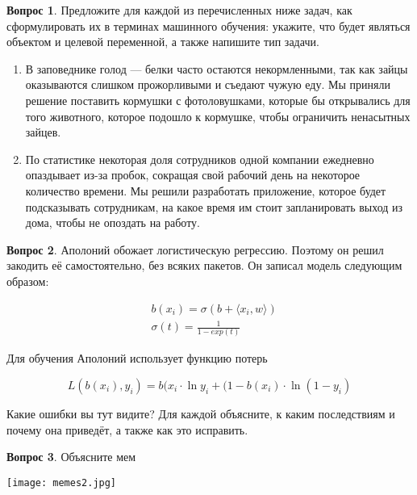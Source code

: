 \documentclass[12pt]{article}
\theoremstyle{definition}
\newtheorem{question}{Вопрос}
\begin{document}
\begin{question}
Предложите для каждой из перечисленных ниже задач, как сформулировать их в терминах машинного обучения: укажите, что будет являться объектом и целевой переменной, а также напишите тип задачи.

\begin{enumerate}
    \item В заповеднике голод --- белки часто остаются некормленными, так как зайцы оказываются слишком прожорливыми и съедают чужую еду. Мы приняли решение поставить кормушки с фотоловушками, которые бы открывались для того животного, которое подошло к кормушке, чтобы ограничить ненасытных зайцев.
  \item По статистике некоторая доля сотрудников одной компании ежедневно опаздывает из-за пробок, сокращая свой рабочий день на некоторое количество времени. Мы решили разработать приложение, которое будет подсказывать сотрудникам, на какое время им стоит запланировать выход из дома, чтобы не опоздать на работу.
\end{enumerate}
\end{question}


\vspace{4cm} 



\begin{question}
Аполоний обожает логистическую регрессию. Поэтому он решил закодить её самостоятельно, без всяких пакетов. Он записал модель следующим образом: 

\begin{equation*} 
\begin{aligned}
    & b(x_i) = \sigma(b + \langle x_i, w \rangle) \\
    & \sigma(t) = \frac{1}{1 - exp(t)}
\end{aligned}
\end{equation*}

Для обучения Аполоний использует функцию потерь 

\[
L(b(x_i), y_i) = b(x_i \cdot \ln y_i + (1 - b(x_i) \cdot \ln (1 - y_i)
\]

Какие ошибки вы тут видите? Для каждой объясните, к каким последствиям и почему она приведёт, а также как это исправить.
\end{question}


\newpage 

\begin{question}
Объясните мем
\begin{center}
  \texttt{[image: memes2.jpg]}
\end{center}
\end{question}
\end{document}
